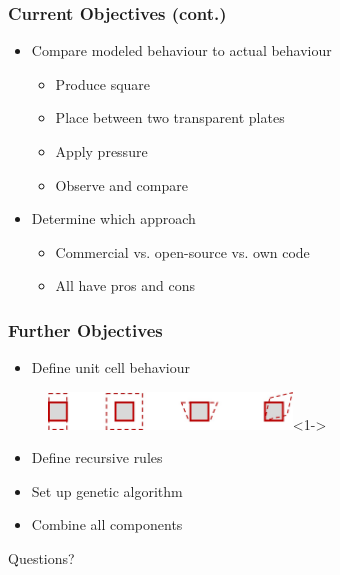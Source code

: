 \documentclass[serif, pdf]{beamer}
\begin{document}
\begin{frame}
    \frametitle{Current Objectives (cont.)}
    \begin{itemize}
        \item<1-> Compare modeled behaviour to actual behaviour
        \changefontsizes{11pt}
        \begin{itemize}
            \item<2-> Produce square
            \item<2-> Place between two transparent plates
            \item<2-> Apply pressure
            \item<2-> Observe and compare
        \end{itemize}
        \item<3-> Determine which approach
        \changefontsizes{11pt}
        \begin{itemize}
            \item<4-> Commercial vs. open-source vs. own code
            \item<5-> All have pros and cons
        \end{itemize}
    \end{itemize}
\end{frame}


\begin{frame}
    \frametitle{Further Objectives}
    \begin{itemize}
        \item<1-> Define unit cell behaviour
    \end{itemize}
    \begin{figure}
        \includegraphics[height = 1cm]{Unit_Cell_Deformation.jpg}<1->
    \end{figure}
    \begin{itemize}
        \item<2-> Define recursive rules
        \item<3-> Set up genetic algorithm
        \item<4-> Combine all components
    \end{itemize}
\end{frame}


\begin{frame}
    \begin{center}
        \huge Questions?
    \end{center}
\end{frame}
\end{document}
